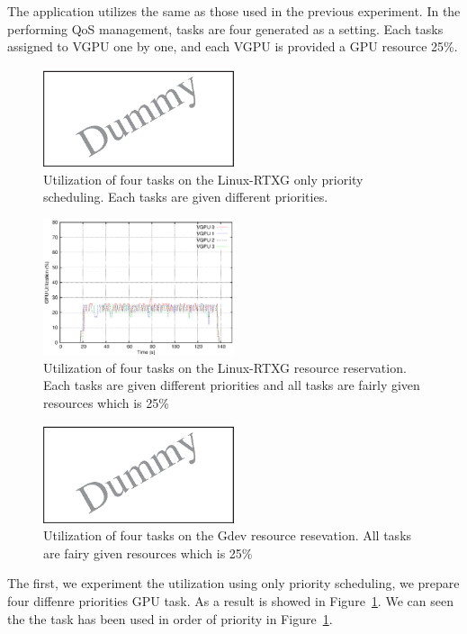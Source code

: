 
The application utilizes the same as those used in the previous experiment.
In the performing QoS management, tasks are four generated as a setting.
Each tasks assigned to VGPU one by one, and each VGPU is provided a GPU resource 25\%.

\begin{figure}[t]
\begin{center}
\includegraphics[width=0.5\textwidth]{img/dummy}
\caption{Utilization of four tasks on the Linux-RTXG only priority scheduling. Each tasks are given different priorities.}
\end{center}
\label{fig:rtx_prio}
\end{figure}

\begin{figure}[t]
\begin{center}
\includegraphics[width=0.5\textwidth]{img/rtx_qos.eps}
\caption{Utilization of four tasks on the Linux-RTXG resource reservation. Each tasks are given different priorities and all tasks are fairly given resources which is 25\%}
\end{center}
\label{fig:qos_rtx}
\end{figure}

\begin{figure}[t]
\begin{center}
\includegraphics[width=0.5\textwidth]{img/dummy}
\caption{Utilization of four tasks on the Gdev resource resevation. All tasks are fairy given resources which is 25\%}
\end{center}
\label{fig:qos_gdev}
\end{figure}
The first, we experiment the utilization using only priority scheduling, we prepare four diffenre priorities GPU task.
As a result is showed in Figure~\ref{fig:rtx_prio}.
We can seen the the task has been used in order of priority in Figure~\ref{fig:rtx_prio}.

